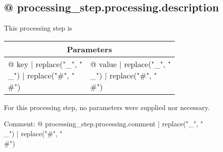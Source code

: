 \subsection{{@ processing_step.processing.description }}

This processing step is %

\vspace*{1ex}
\begin{tabular}{ll}
\toprule
\multicolumn{2}{c}{\textbf{Parameters}}
\\
\midrule
{@ key | replace("_", "\\_") | replace("#", "\\#") } & {@ value | replace("_", "\\_") | replace("#", "\\#") }
\\
\bottomrule
\end{tabular}
\vspace*{1ex}
For this processing step, no parameters were supplied nor necessary.

Comment: {@ processing_step.processing.comment | replace("_", "\\_") | replace("#", "\\#") }
